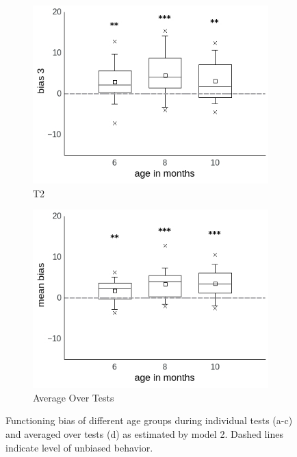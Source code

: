\documentclass[a4paper]{scrreprt}
\begin{document}
\begin{figure}
    \begin{subfigure}[b]{0.49\textwidth}
        \includegraphics[width=\textwidth]{figs/sec3/age/age_diff3_mod2.jpeg}
        \caption{T2}
    \end{subfigure}
    \begin{subfigure}[b]{0.49\textwidth}
        \includegraphics[width=\textwidth]{figs/sec3/age/age_diff_mean_mod2.jpeg}
        \caption{Average Over Tests}
    \end{subfigure}
\caption{Functioning bias of different age groups during individual tests (a-c) and averaged over tests (d) as estimated by model 2. Dashed lines indicate level of unbiased behavior.}
\label{fig:age_diff_mod2}
\end{figure}
\end{document}

